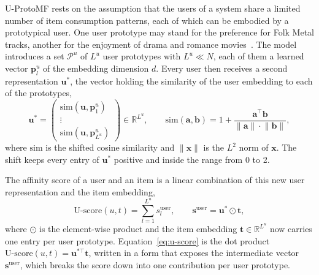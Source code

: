 U-ProtoMF rests on the assumption that the users of a system share a limited
number of item consumption patterns, each of which can be embodied by a
prototypical user. One user prototype may stand for the preference for Folk
Metal tracks, another for the enjoyment of drama and romance
movies~\cite{melchiorre2022protomf}. The model introduces a set $\mathcal{P}^u$
of $L^u$ user prototypes with $L^u \ll N$, each of them a learned vector
$\mathbf{p}^u_l$ of the embedding dimension $d$. Every user then receives a
second representation $\mathbf{u}^*$, the vector holding the similarity of the
user embedding to each of the prototypes,
\begin{equation}
\mathbf{u}^* =
\begin{pmatrix}
\mathrm{sim}(\mathbf{u}, \mathbf{p}^u_1) \\
\vdots \\
\mathrm{sim}(\mathbf{u}, \mathbf{p}^u_{L^u})
\end{pmatrix}
\in \mathbb{R}^{L^u},
\qquad
\mathrm{sim}(\mathbf{a}, \mathbf{b}) = 1 +
\frac{\mathbf{a}^\top \mathbf{b}}
     {\lVert \mathbf{a} \rVert \cdot \lVert \mathbf{b} \rVert},
\label{eq:proto-sim}
\end{equation}
where $\mathrm{sim}$ is the shifted cosine similarity and
$\lVert \mathbf{x} \rVert$ is the $L^2$ norm of $\mathbf{x}$. The shift keeps
every entry of $\mathbf{u}^*$ positive and inside the range from 0 to 2.

The affinity score of a user and an item is a linear combination of this new
user representation and the item embedding,
\begin{equation}
\text{U-score}(u,t) = \sum_{l=1}^{L^u} s^{\mathrm{user}}_l,
\qquad
\mathbf{s}^{\mathrm{user}} = \mathbf{u}^* \odot \mathbf{t},
\label{eq:u-score}
\end{equation}
where $\odot$ is the element-wise product and the item embedding
$\mathbf{t} \in \mathbb{R}^{L^u}$ now carries one entry per user prototype.
Equation~\ref{eq:u-score} is the dot product
$\text{U-score}(u,t) = \mathbf{u}^{*\top} \mathbf{t}$, written in a form that
exposes the intermediate vector $\mathbf{s}^{\mathrm{user}}$, which breaks the
score down into one contribution per user prototype.

